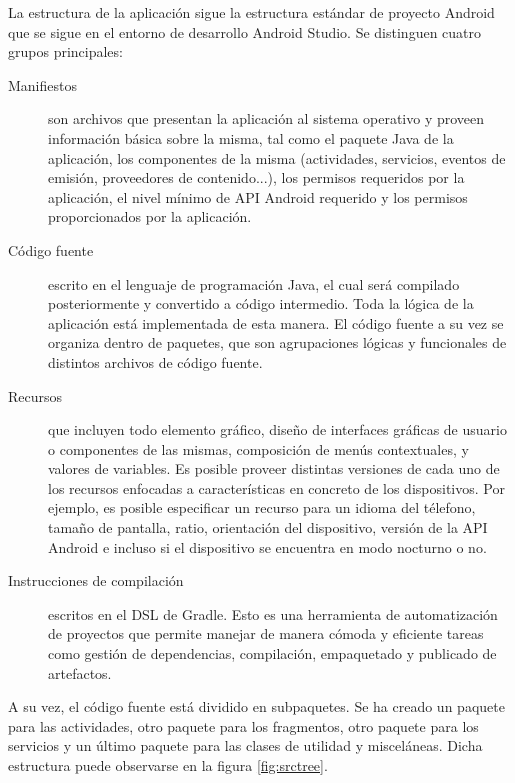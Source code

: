 La estructura de la aplicación sigue la estructura estándar de proyecto Android que se sigue en el entorno de desarrollo Android Studio. Se distinguen cuatro grupos principales:
\begin{description}
\item[Manifiestos] son archivos que presentan la aplicación al sistema operativo y proveen información básica sobre la misma, tal como el paquete Java de la aplicación, los componentes de la misma (actividades, servicios, eventos de emisión, proveedores de contenido...), los permisos requeridos por la aplicación, el nivel mínimo de \ac{API} Android requerido y los permisos proporcionados por la aplicación.
\item[Código fuente] escrito en el lenguaje de programación Java, el cual será compilado posteriormente y convertido a código intermedio. Toda la lógica de la aplicación está implementada de esta manera. El código fuente a su vez se organiza dentro de paquetes, que son agrupaciones lógicas y funcionales de distintos archivos de código fuente.
\item[Recursos] que incluyen todo elemento gráfico, diseño de interfaces gráficas de usuario o componentes de las mismas, composición de menús contextuales, y valores de variables. Es posible proveer distintas versiones de cada uno de los recursos enfocadas a características en concreto de los dispositivos. Por ejemplo, es posible especificar un recurso para un idioma del télefono, tamaño de pantalla, ratio, orientación del dispositivo, versión de la API Android e incluso si el dispositivo se encuentra en modo nocturno o no.
\item[Instrucciones de compilación] escritos en el \ac{DSL} de Gradle. Esto es una herramienta de automatización de proyectos que permite manejar de manera cómoda y eficiente tareas como gestión de dependencias, compilación, empaquetado y publicado de artefactos.
\end{description}
 
 A su vez, el código fuente está dividido en subpaquetes. Se ha creado un paquete para las actividades, otro paquete para los fragmentos, otro paquete para los servicios y un último paquete para las clases de utilidad y misceláneas. Dicha estructura puede observarse en la figura \ref{fig:srctree}.
 
